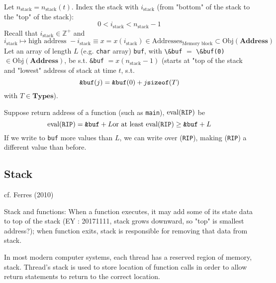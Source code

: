 \documentclass[10pt]{amsart}
\begin{document}
\begin{multicols*}{2}
Let $n_{\text{stack}} = n_{\text{stack}}(t)$.  Index the stack with $i_{\text{stack}}$ (from "bottom" of the stack to the "top" of the stack):
\[
0 < i_{\text{stack}} < n_{\text{stack}} - 1
\]
Recall that $i_{\text{stack}} \in \mathbb{Z}^+$ and 
\[
i_{\text{stack}} \mapsto \text{high address } - i_{\text{stack}} \equiv x = x(i_{\text{stack}}) \in \text{Addresses}_{\text{Memory block}} \subset \text{Obj}(\textbf{Address})
\]
Let an array of length $L$ (e.g. \verb|char| array) \verb|buf|, with \verb|\&buf| $=$ \verb|\&buf(0)| $\in  \text{Obj}{(\textbf{Address})}$, be s.t. \verb|&buf| $=x(n_{\text{stack}}-1)$ (starts at "top of the stack and "lowest" address of stack at time $t$, s.t. 
\[
\verb|&buf|(j) = \verb|&buf|(0) + j \verb|sizeof|(T)
\]
with $T\in \textbf{Types}$).  


Suppose return address of a function (such as \verb|main|), $\text{eval}(\verb|RIP|)$ be 
\[
\text{eval}(\verb|RIP|) = \verb|&buf| + L \text{or at least } \text{eval}(\verb|RIP|) \geq \verb|&buf| + L
\]
If we write to \verb|buf| more values than $L$, we can write over (\verb|RIP|), making (\verb|RIP|) a different value than before.  

\subsection{Stack}
cf. Ferres (2010) \cite{Ferr2010}

Stack and functions: When a function executes, it may add some of its state data to top of the stack (EY : 20171111, stack grows downward, so "top" is smallest address?); when function exits, stack is responsible for removing that data from stack.  

In most modern computer systems, each thread has a reserved region of memory, stack.  Thread's stack is used to store location of function calls in order to allow return statements to return to the correct location.  


\end{multicols*}
\end{document}
